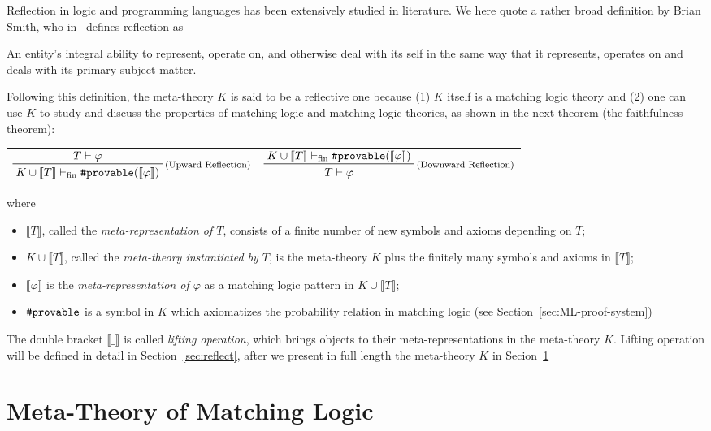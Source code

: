 \documentclass[UTF8,11pt]{article}
\theoremstyle{plain}
\theoremstyle{definition}
\theoremstyle{remark}
\newcommand{\vdashfin}{\vdash_\text{fin}}
\newcommand{\denote}[1]{\llbracket{#1}\rrbracket}
\newcommand{\sharpsymbol}{\#}
\newcommand{\Kdeduce}{\textup{\texttt{\sharpsymbol provable}}}
\begin{document}
Reflection in logic and programming languages has been extensively studied 
in literature.
We here quote a rather broad definition by Brian Smith, who in~\cite{smith-1984-popl} defines 
reflection as
\begin{displayquote}
	An entity’s integral ability to represent, operate on,
	and otherwise deal with its self in the same way that
	it represents, operates on and deals with its primary
	subject matter.
\end{displayquote}
Following this definition, the meta-theory $K$ is said to be a {reflective} one 
because 
(1) $K$ itself is a matching logic theory and 
(2) one can use $K$ to study and discuss the properties of matching logic and 
matching logic theories, as shown in the next theorem (the faithfulness 
theorem):
\begin{center}
	\begin{tabular}{cc}
		$
		\prftree[r]{\footnotesize (Upward Reflection)}
		{T \vdash \varphi}
		{K \cup \denote{T} \vdashfin \Kdeduce(\denote{\varphi})}
		$
		&
		$
		\prftree[r]{\footnotesize (Downward Reflection)}
		{K \cup \denote{T} \vdashfin \Kdeduce(\denote{\varphi})}
		{T \vdash \varphi}
		$
	\end{tabular}
\end{center}
where 
\begin{itemize}
	\item $\denote{T}$, called the \emph{meta-representation of $T$}, consists of a finite number of new symbols and axioms depending on $T$;
	\item $K \cup \denote{T}$, called the \emph{meta-theory instantiated by $T$}, is the meta-theory $K$ plus the finitely many symbols and axioms in $\denote{T}$;
	\item $\denote{\varphi}$ is the \emph{meta-representation of $\varphi$} as a matching logic pattern in $K \cup \denote{T}$;
	\item $\Kdeduce$ is a symbol in $K$ which axiomatizes the probability 
	relation in matching logic (see Section~\ref{sec:ML-proof-system})
\end{itemize}

The double bracket $\denote{\_}$ is called \emph{lifting operation}, which 
brings 
objects to their meta-representations in the meta-theory $K$.
Lifting operation will be defined in detail in Section~\ref{sec:reflect}, after 
we 
present in full length the meta-theory $K$ in Secion~\ref{sec:meta-theory}

\section{Meta-Theory of Matching Logic}
\label{sec:meta-theory}
\end{document}
